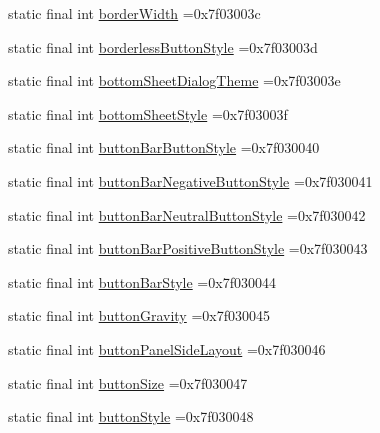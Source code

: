 \begin{DoxyCompactItemize}
\item 
static final int \mbox{\hyperlink{classbr_1_1unb_1_1cic_1_1mp_1_1marketmaster_1_1R_1_1attr_abd8186b8a4c9d381cb6990a350cea7d5}{border\+Width}} =0x7f03003c
\item 
static final int \mbox{\hyperlink{classbr_1_1unb_1_1cic_1_1mp_1_1marketmaster_1_1R_1_1attr_ae56a75d4e5154615469edac4257da994}{borderless\+Button\+Style}} =0x7f03003d
\item 
static final int \mbox{\hyperlink{classbr_1_1unb_1_1cic_1_1mp_1_1marketmaster_1_1R_1_1attr_afb3dcdb1612a6c308c9240b4a97cb31b}{bottom\+Sheet\+Dialog\+Theme}} =0x7f03003e
\item 
static final int \mbox{\hyperlink{classbr_1_1unb_1_1cic_1_1mp_1_1marketmaster_1_1R_1_1attr_ad6ae3dee0caa094fc198ae2e503c1bf3}{bottom\+Sheet\+Style}} =0x7f03003f
\item 
static final int \mbox{\hyperlink{classbr_1_1unb_1_1cic_1_1mp_1_1marketmaster_1_1R_1_1attr_ab623b9b10b785557c21779b6772e4274}{button\+Bar\+Button\+Style}} =0x7f030040
\item 
static final int \mbox{\hyperlink{classbr_1_1unb_1_1cic_1_1mp_1_1marketmaster_1_1R_1_1attr_a440b59058a1b8983270f9dbf46216aca}{button\+Bar\+Negative\+Button\+Style}} =0x7f030041
\item 
static final int \mbox{\hyperlink{classbr_1_1unb_1_1cic_1_1mp_1_1marketmaster_1_1R_1_1attr_ae57b4f1789f94a4a7eb951267fe663a9}{button\+Bar\+Neutral\+Button\+Style}} =0x7f030042
\item 
static final int \mbox{\hyperlink{classbr_1_1unb_1_1cic_1_1mp_1_1marketmaster_1_1R_1_1attr_a2402d49ff5a124692627245a8d764400}{button\+Bar\+Positive\+Button\+Style}} =0x7f030043
\item 
static final int \mbox{\hyperlink{classbr_1_1unb_1_1cic_1_1mp_1_1marketmaster_1_1R_1_1attr_a23e21de3eeab8c0a6c048f8f3b3f0d9f}{button\+Bar\+Style}} =0x7f030044
\item 
static final int \mbox{\hyperlink{classbr_1_1unb_1_1cic_1_1mp_1_1marketmaster_1_1R_1_1attr_a349010c89193cb66e5c0e4dc195a62e1}{button\+Gravity}} =0x7f030045
\item 
static final int \mbox{\hyperlink{classbr_1_1unb_1_1cic_1_1mp_1_1marketmaster_1_1R_1_1attr_abea9ea5c1f050d777a64ee9677f012c7}{button\+Panel\+Side\+Layout}} =0x7f030046
\item 
static final int \mbox{\hyperlink{classbr_1_1unb_1_1cic_1_1mp_1_1marketmaster_1_1R_1_1attr_a228227b5d1639b512ef69c8478ff47a7}{button\+Size}} =0x7f030047
\item 
static final int \mbox{\hyperlink{classbr_1_1unb_1_1cic_1_1mp_1_1marketmaster_1_1R_1_1attr_a7e379a892c19cb9a90ffdda5d5b8ed89}{button\+Style}} =0x7f030048

\end{DoxyCompactItemize}
